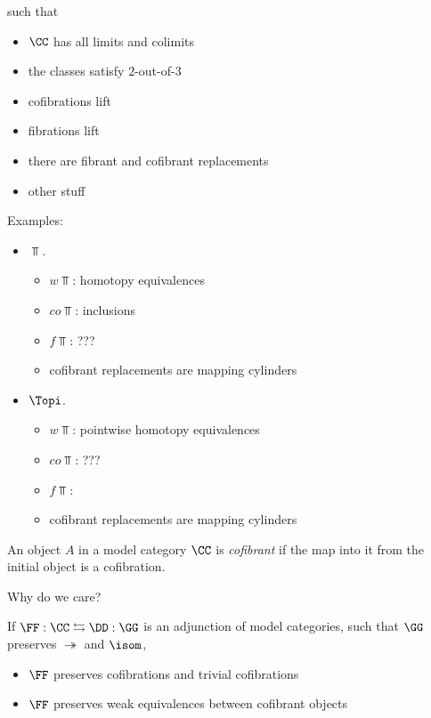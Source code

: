 \documentclass{article}
\begin{document}
such that

\begin{itemize}
\item $\CC$ has all limits and colimits
\item the classes satisfy $2$-out-of-$3$
\item cofibrations lift
\item fibrations lift
\item there are fibrant and cofibrant replacements
\item other stuff
\end{itemize}

Examples:

\begin{itemize}
\item $\Top$.
  \begin{itemize}
  \item $w\Top$: homotopy equivalences
  \item $co\Top$: inclusions
  \item $f\Top$: ???
  \item cofibrant replacements are mapping cylinders
  \end{itemize}

\item $\Topi$.
  \begin{itemize}
  \item $w\Top$: pointwise homotopy equivalences
  \item $co\Top$: ???
  \item $f\Top$: 
  \item cofibrant replacements are mapping cylinders
  \end{itemize}
\end{itemize}
\begin{defn}
 An object $A$ in a model category $\CC$ is \textit{cofibrant} if the map into
 it from the initial object is a cofibration. 
\end{defn}

Why do we care?
\begin{thm}[Quillen]
  If $\FF:\CC\leftrightarrows\DD:\GG$ is an adjunction of model categories, such
  that $\GG$ preserves $\twoheadrightarrow$ and $\isom$, 
  \begin{itemize}
  \item $\FF$ preserves cofibrations and trivial cofibrations
  \item $\FF$ preserves weak equivalences between cofibrant objects
  \end{itemize}
\end{thm}
\end{document}
